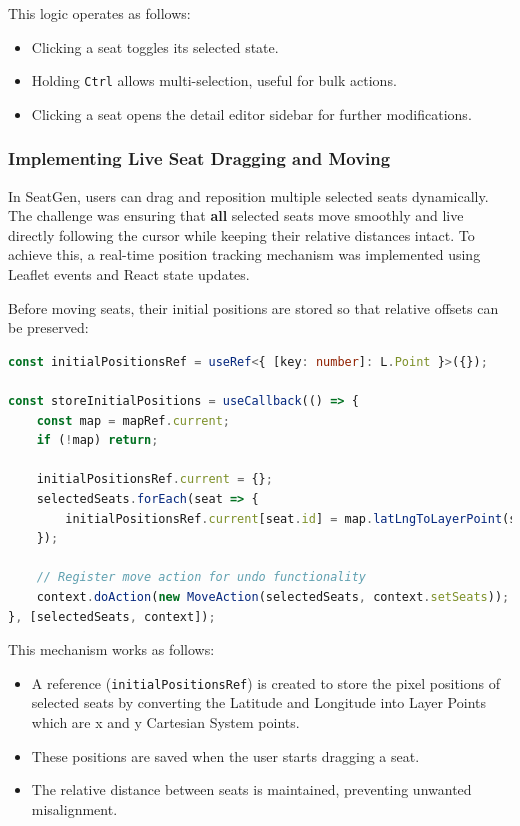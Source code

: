 This logic operates as follows:
\begin{itemize}
    \item Clicking a seat toggles its selected state.
    \item Holding \texttt{Ctrl} allows multi-selection, useful for bulk actions.
    \item Clicking a seat opens the detail editor sidebar for further modifications.
\end{itemize}


\subsubsection{Implementing Live Seat Dragging and Moving}

In SeatGen, users can drag and reposition multiple selected seats dynamically. The challenge was ensuring that \textbf{all} selected seats move smoothly and live directly following the cursor while keeping their relative distances intact. To achieve this, a real-time position tracking mechanism was implemented using Leaflet events and React state updates.

Before moving seats, their initial positions are stored so that relative offsets can be preserved:

\begin{lstlisting}[language=TypeScript, caption=Storing Initial Positions Before Dragging, label=lst:seat-initial-pos]
const initialPositionsRef = useRef<{ [key: number]: L.Point }>({});

const storeInitialPositions = useCallback(() => {
    const map = mapRef.current;
    if (!map) return;

    initialPositionsRef.current = {};
    selectedSeats.forEach(seat => {
        initialPositionsRef.current[seat.id] = map.latLngToLayerPoint(seat.position);
    });

    // Register move action for undo functionality
    context.doAction(new MoveAction(selectedSeats, context.setSeats));
}, [selectedSeats, context]);
\end{lstlisting}

This mechanism works as follows:
\begin{itemize}
    \item A reference (\texttt{initialPositionsRef}) is created to store the pixel positions of selected seats by converting the Latitude and Longitude into Layer Points which are x and y Cartesian System points.
    \item These positions are saved when the user starts dragging a seat.
    \item The relative distance between seats is maintained, preventing unwanted misalignment.
\end{itemize}

